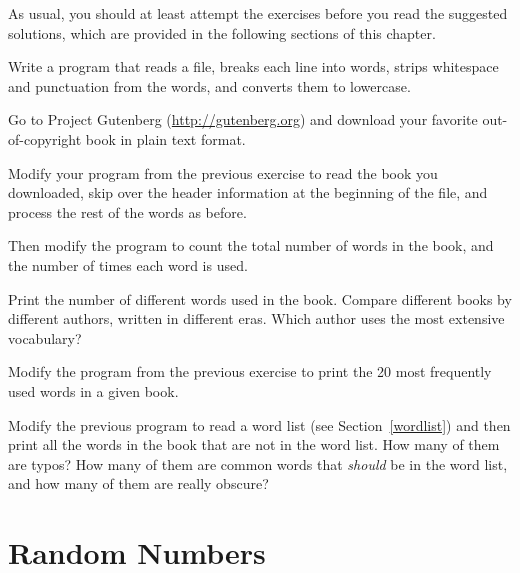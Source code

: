 As usual, you should at least attempt the exercises
before you read the suggested solutions, which are 
provided in the following sections of this chapter.

\begin{exercise}

Write a program that reads a file, breaks each line into
words, strips whitespace and punctuation from the words, and
converts them to lowercase.

\end{exercise}


\begin{exercise}

Go to Project Gutenberg (\url{http://gutenberg.org}) and download 
your favorite out-of-copyright book in plain text format.

Modify your program from the previous exercise to read the book
you downloaded, skip over the header information at the beginning
of the file, and process the rest of the words as before.

Then modify the program to count the total number of words in
the book, and the number of times each word is used.

Print the number of different words used in the book.  Compare
different books by different authors, written in different eras.
Which author uses the most extensive vocabulary?
\end{exercise}


\begin{exercise}

Modify the program from the previous exercise to print the
20 most frequently used words in a given book.

\end{exercise}


\begin{exercise}

Modify the previous program to read a word list (see
Section~\ref{wordlist}) and then print all the words in the book that
are not in the word list.  How many of them are typos?  How many of
them are common words that {\em should} be in the word list, and how
many of them are really obscure?

\end{exercise}


\section{Random Numbers}

